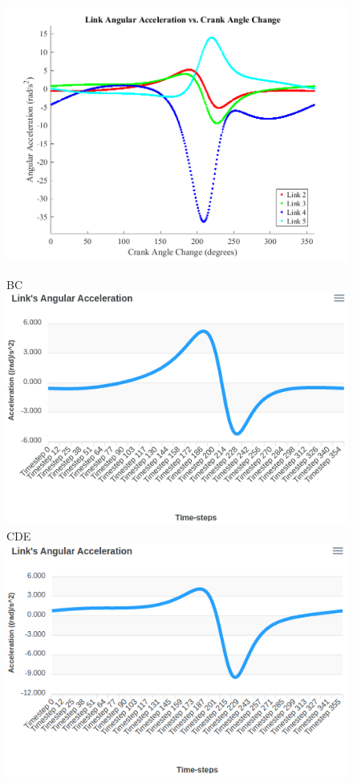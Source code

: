 \documentclass[12pt]{article}
\newcommand\hs{\hspace{1cm}}
\begin{document}
\begin{figure}[ht]
  \centering
  \includegraphics[scale=0.5]{../matlab-plots/angLinkAccel.png}

  BC \includegraphics[scale=0.35]{../pmks-plots/angLinkAcc/angLinkAccBC.png}%
  \hs CDE \includegraphics[scale=0.35]{../pmks-plots/angLinkAcc/angLinkAccCDE.png}


\end{figure}
\end{document}
